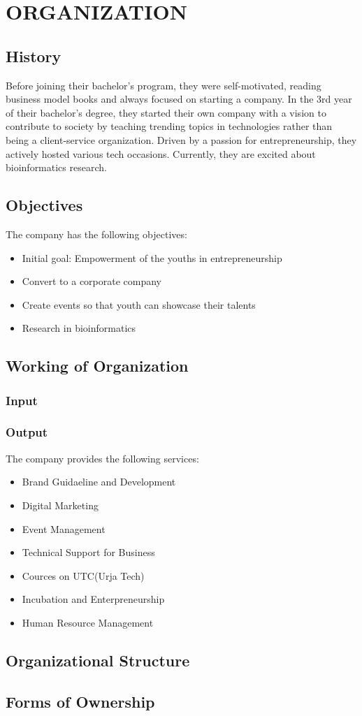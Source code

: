 
\chapter{ORGANIZATION}
      \section{History}
      Before joining their bachelor's program, they were self-motivated, reading business model books and always focused on starting a company. In the 3rd year of their bachelor's degree, they started their own company with a vision to contribute to society by teaching trending topics in technologies rather than being a client-service organization. Driven by a passion for entrepreneurship, they actively hosted various tech occasions. Currently, they are excited about bioinformatics research.
      
      \section{Objectives}
      The company has the following objectives:
      \begin{itemize}
        \item Initial goal: Empowerment of the youths in entrepreneurship
        \item Convert to a corporate company
        \item Create events so that youth can showcase their talents
        \item Research in bioinformatics
      \end{itemize}

      \section{Working of Organization}
      \subsection{\textbf{Input}}

      \subsection{\textbf{Output}}
      The company provides the following services:
      \begin{itemize}
        \item Brand Guidaeline and Development
        \item Digital Marketing
        \item Event Management
        \item Technical Support for Business
        \item Cources on UTC(Urja Tech)
        \item Incubation and Enterpreneurship
        \item Human Resource Management
      \end{itemize}

      \section{Organizational Structure}

      \section{Forms of Ownership}
